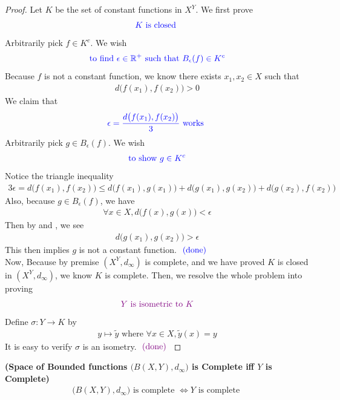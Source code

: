 \documentclass{report}
\begin{document}
\begin{proof}
Let $K$ be the set of constant functions  in $X^Y$. We first prove 
 \begin{align*}
\textcolor{blue}{K\text{ is closed }}
\end{align*}
Arbitrarily pick $f \in K^c$. We wish 
\begin{align*}
\textcolor{blue}{\text{ to find $\epsilon \in\mathbb{R}^+$ such that $B_{\epsilon }(f) \in K^c$ }}
\end{align*}
Because $f$ is not a constant function, we know there exists $x_1,x_2 \in X$ such that 
\begin{align*}
d\big(f(x_1),f(x_2) \big)>0
\end{align*}
We claim that 
\begin{align*}
\textcolor{blue}{\epsilon=\frac{d\big(f(x_1),f(x_2) \big)}{3}\text{ works }}
\end{align*}
Arbitrarily pick $g \in B_\epsilon(f)$. We wish 
\begin{align*}
\textcolor{blue}{\text{ to show $g\in K^c$  }}
\end{align*}
Notice the triangle inequality 
\begin{align}
\label{K7}
3\epsilon =d\big(f(x_1),f(x_2) \big)\leq d\big(f(x_1),g(x_1) \big)+d\big(g(x_1),g(x_2) \big)+d\big(g(x_2),f(x_2) \big)
\end{align}
Also, because $g\in B_\epsilon (f)$, we have
\begin{align}
  \label{K8}
\forall x\in X, d\big(f(x),g(x) \big)<\epsilon 
\end{align}
Then by  and , we see 
\begin{align*}
d\big(g(x_1),g(x_2) \big)> \epsilon 
\end{align*}
This then implies $g$ is not a constant function.  $\textcolor{blue}{\text{ (done) }}$\\

Now, Because by premise $(X^Y,d_{\infty})$ is complete, and we have proved $K$ is closed in  $(X^Y,d_\infty)$, we know $K$ is complete. Then, we resolve the whole problem into proving 
\begin{align*}
\textcolor{violet}{Y \text{ is isometric to }K}
\end{align*}
Define $\sigma:Y \to K $ by 
\begin{align*}
y \mapsto \tilde{y}\text{ where }\forall x \in X, \tilde{y}(x)=y 
\end{align*}
It is easy to verify $\sigma$ is an isometry. $\textcolor{violet}{\text{ (done) }}$ 
\end{proof}
\begin{corollary}
\label{SoB}
\textbf{(Space of Bounded functions $\big(B(X,Y),d_{\infty} \big)$ is Complete iff  $Y$ is Complete)} 
\begin{align*}
\big(B(X,Y),d_\infty \big)\text{ is complete }\iff  Y\text{ is complete }
\end{align*}
\end{corollary}
\end{document}
